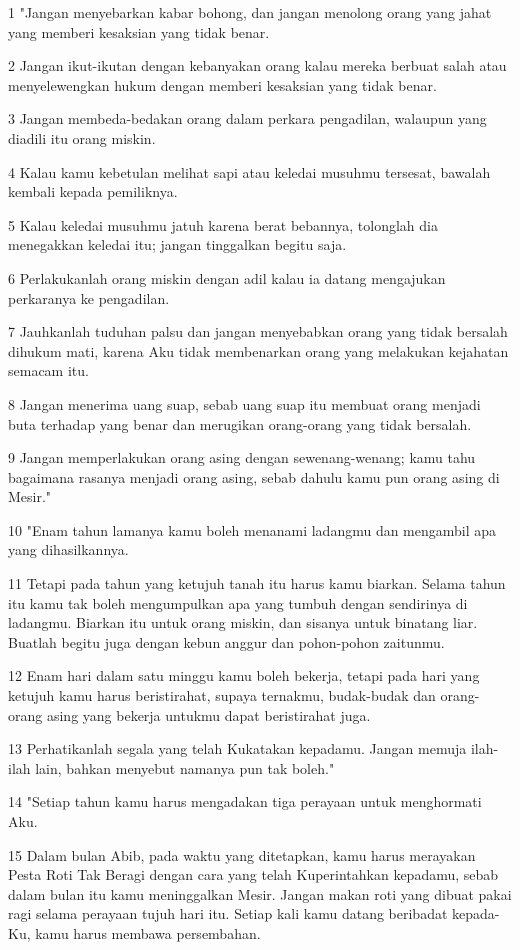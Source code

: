 \par 1 "Jangan menyebarkan kabar bohong, dan jangan menolong orang yang jahat yang memberi kesaksian yang tidak benar.
\par 2 Jangan ikut-ikutan dengan kebanyakan orang kalau mereka berbuat salah atau menyelewengkan hukum dengan memberi kesaksian yang tidak benar.
\par 3 Jangan membeda-bedakan orang dalam perkara pengadilan, walaupun yang diadili itu orang miskin.
\par 4 Kalau kamu kebetulan melihat sapi atau keledai musuhmu tersesat, bawalah kembali kepada pemiliknya.
\par 5 Kalau keledai musuhmu jatuh karena berat bebannya, tolonglah dia menegakkan keledai itu; jangan tinggalkan begitu saja.
\par 6 Perlakukanlah orang miskin dengan adil kalau ia datang mengajukan perkaranya ke pengadilan.
\par 7 Jauhkanlah tuduhan palsu dan jangan menyebabkan orang yang tidak bersalah dihukum mati, karena Aku tidak membenarkan orang yang melakukan kejahatan semacam itu.
\par 8 Jangan menerima uang suap, sebab uang suap itu membuat orang menjadi buta terhadap yang benar dan merugikan orang-orang yang tidak bersalah.
\par 9 Jangan memperlakukan orang asing dengan sewenang-wenang; kamu tahu bagaimana rasanya menjadi orang asing, sebab dahulu kamu pun orang asing di Mesir."
\par 10 "Enam tahun lamanya kamu boleh menanami ladangmu dan mengambil apa yang dihasilkannya.
\par 11 Tetapi pada tahun yang ketujuh tanah itu harus kamu biarkan. Selama tahun itu kamu tak boleh mengumpulkan apa yang tumbuh dengan sendirinya di ladangmu. Biarkan itu untuk orang miskin, dan sisanya untuk binatang liar. Buatlah begitu juga dengan kebun anggur dan pohon-pohon zaitunmu.
\par 12 Enam hari dalam satu minggu kamu boleh bekerja, tetapi pada hari yang ketujuh kamu harus beristirahat, supaya ternakmu, budak-budak dan orang-orang asing yang bekerja untukmu dapat beristirahat juga.
\par 13 Perhatikanlah segala yang telah Kukatakan kepadamu. Jangan memuja ilah-ilah lain, bahkan menyebut namanya pun tak boleh."
\par 14 "Setiap tahun kamu harus mengadakan tiga perayaan untuk menghormati Aku.
\par 15 Dalam bulan Abib, pada waktu yang ditetapkan, kamu harus merayakan Pesta Roti Tak Beragi dengan cara yang telah Kuperintahkan kepadamu, sebab dalam bulan itu kamu meninggalkan Mesir. Jangan makan roti yang dibuat pakai ragi selama perayaan tujuh hari itu. Setiap kali kamu datang beribadat kepada-Ku, kamu harus membawa persembahan.
